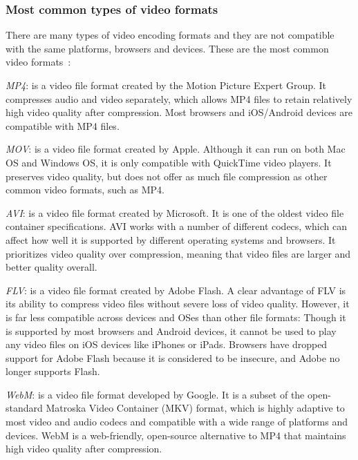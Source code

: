 \subsubsection{Most common types of video formats}
There are many types of video encoding formats and they are not compatible with the same platforms, browsers and devices.
These are the most common video formats~\cite{video-encoding}:
\begin{item-c}
\item \emph{MP4}: is a video file format created by the Motion Picture Expert Group. It compresses audio and video separately, which allows MP4 files to retain relatively high video quality after compression. Most browsers and iOS/Android devices are compatible with MP4 files.
%
\item \emph{MOV}: is a video file format created by Apple. Although it can run on both Mac OS and Windows OS, it is only compatible with QuickTime video players. It preserves video quality, but does not offer as much file compression as other common video formats, such as MP4.
%
\item \emph{AVI}: is a video file format created by Microsoft. It is one of the oldest video file container specifications. AVI works with a number of different codecs, which can affect how well it is supported by different operating systems and browsers. It prioritizes video quality over compression, meaning that video files are larger and better quality overall.
%
\item \emph{FLV}: is a video file format created by Adobe Flash. A clear advantage of FLV is its ability to compress video files without severe loss of video quality. However, it is far less compatible across devices and OSes than other file formats: Though it is supported by most browsers and Android devices, it cannot be used to play any video files on iOS devices like iPhones or iPads. Browsers have dropped support for Adobe Flash because it is considered to be insecure, and Adobe no longer supports Flash.
%
\item \emph{WebM}: is a video file format developed by Google. It is a subset of the open-standard Matroska Video Container (MKV) format, which is highly adaptive to most video and audio codecs and compatible with a wide range of platforms and devices. WebM is a web-friendly, open-source alternative to MP4 that maintains high video quality after compression.
\end{item-c}

